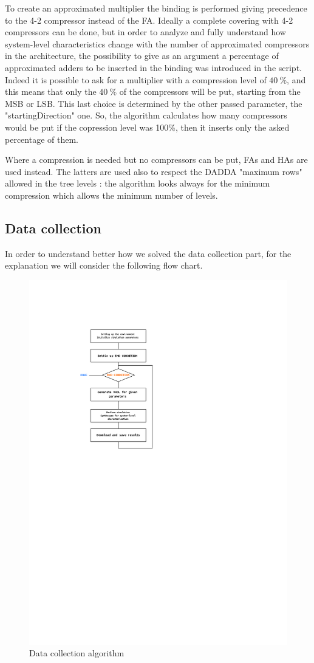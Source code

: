 \documentclass[a4paper]{article}
\begin{document}
	To create an approximated multiplier the binding is performed giving precedence to the 4-2 compressor instead of the FA. Ideally a complete covering with 4-2 compressors can be done, but in order to analyze and fully understand how system-level characteristics change with the number of approximated compressors in the architecture, the possibility to give as an argument a percentage of approximated adders to be inserted in the binding was introduced in the script.
	Indeed it is possible to ask for a multiplier with a compression level of $40\ \%$, and this means that only the $40\ \%$ of the compressors will be put, starting from the MSB or LSB. This last choice is determined by the other passed parameter, the "startingDirection" one. So, the algorithm calculates how many compressors would be put if the copression level was 100\%, then it inserts only the asked percentage of them.

	Where a compression is needed but no compressors can be put, FAs and HAs are used instead. The latters are used also to respect the DADDA "maximum rows" allowed in the tree levels : the algorithm looks always for the minimum compression which allows the minimum number of levels.

	\subsection{Data collection}
	In order to understand better how we solved the data collection part, for the explanation we will consider the following flow chart.
	\begin{figure}[hbtp]
	\centering
	\includegraphics[width=0.5\linewidth]{media/Algorithm_Flowchart.png}
	\caption{Data collection algorithm}
	\label{fig:v1-bind0}
	\end{figure}
\end{document}
